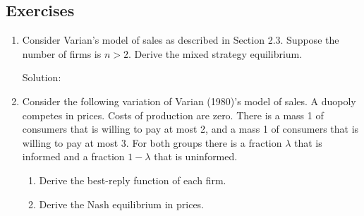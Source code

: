 \subsection{Exercises}
\begin{enumerate}
	\item Consider Varian's model of sales as described in Section 2.3.
	      Suppose the number of firms is $n>2$. Derive the mixed strategy
	      equilibrium.

	      Solution:
	\item Consider the following variation of Varian (1980)’s model of sales.
	      A duopoly
	      competes in prices. Costs of production are zero. There is a mass 1 of consumers
	      that is willing to pay at most 2, and a mass 1 of consumers that is willing to pay at
	      most 3. For both groups there is a fraction $\lambda$ that is informed and a fraction $1-\lambda$
	      that is uninformed.
	      \begin{enumerate}
		      \item Derive the best-reply function of each firm.
		      \item Derive the Nash equilibrium in prices.
	      \end{enumerate}


\end{enumerate}
